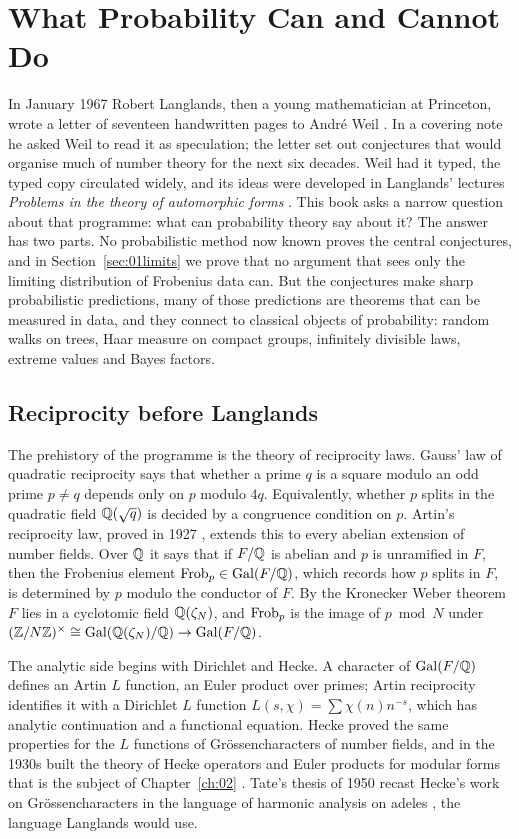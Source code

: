\chapter{What Probability Can and Cannot Do}\label{ch:01}

In January 1967 Robert Langlands, then a young mathematician at Princeton, wrote a letter of seventeen handwritten pages to Andr\'e Weil \cite{langlands1967}. In a covering note he asked Weil to read it as speculation; the letter set out conjectures that would organise much of number theory for the next six decades. Weil had it typed, the typed copy circulated widely, and its ideas were developed in Langlands' lectures \emph{Problems in the theory of automorphic forms} \cite{langlands1970}. This book asks a narrow question about that programme: what can probability theory say about it? The answer has two parts. No probabilistic method now known proves the central conjectures, and in Section~\ref{sec:01limits} we prove that no argument that sees only the limiting distribution of Frobenius data can. But the conjectures make sharp probabilistic predictions, many of those predictions are theorems that can be measured in data, and they connect to classical objects of probability: random walks on trees, Haar measure on compact groups, infinitely divisible laws, extreme values and Bayes factors.

\section{Reciprocity before Langlands}

The prehistory of the programme is the theory of reciprocity laws. Gauss' law of quadratic reciprocity says that whether a prime $q$ is a square modulo an odd prime $p\ne q$ depends only on $p$ modulo $4q$. Equivalently, whether $p$ splits in the quadratic field $\mathbb{Q}(\sqrt q)$ is decided by a congruence condition on $p$. Artin's reciprocity law, proved in 1927 \cite{artin1927}, extends this to every abelian extension of number fields. Over $\mathbb{Q}$ it says that if $F/\mathbb{Q}$ is abelian and $p$ is unramified in $F$, then the Frobenius element $\operatorname{Frob}_p\in\operatorname{Gal}(F/\mathbb{Q})$, which records how $p$ splits in $F$, is determined by $p$ modulo the conductor of $F$. By the Kronecker Weber theorem $F$ lies in a cyclotomic field $\mathbb{Q}(\zeta_N)$, and $\operatorname{Frob}_p$ is the image of $p\bmod N$ under $(\mathbb{Z}/N\mathbb{Z})^\times\cong\operatorname{Gal}(\mathbb{Q}(\zeta_N)/\mathbb{Q})\to\operatorname{Gal}(F/\mathbb{Q})$.

The analytic side begins with Dirichlet and Hecke. A character of $\operatorname{Gal}(F/\mathbb{Q})$ defines an Artin $L$ function, an Euler product over primes; Artin reciprocity identifies it with a Dirichlet $L$ function $L(s,\chi)=\sum\chi(n)n^{-s}$, which has analytic continuation and a functional equation. Hecke proved the same properties for the $L$ functions of Gr\"ossencharacters of number fields, and in the 1930s built the theory of Hecke operators and Euler products for modular forms that is the subject of Chapter~\ref{ch:02} \cite{hecke1937}. Tate's thesis of 1950 recast Hecke's work on Gr\"ossencharacters in the language of harmonic analysis on adeles \cite{tate1967}, the language Langlands would use.

